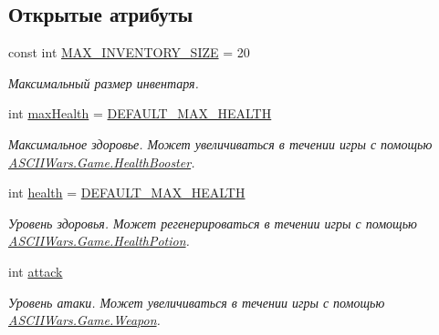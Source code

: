 \subsection*{Открытые атрибуты}
\begin{DoxyCompactItemize}
\item 
const int \hyperlink{class_a_s_c_i_i_wars_1_1_game_1_1_player_a1cc8a05398a717bcf8c5a0ebd2ea0747}{M\+A\+X\+\_\+\+I\+N\+V\+E\+N\+T\+O\+R\+Y\+\_\+\+S\+I\+ZE} = 20
\begin{DoxyCompactList}\small\item\em Максимальный размер инвентаря. \end{DoxyCompactList}\item 
int \hyperlink{class_a_s_c_i_i_wars_1_1_game_1_1_player_acfd121f865f0e5a87f177e93c82feadc}{max\+Health} = \hyperlink{class_a_s_c_i_i_wars_1_1_game_1_1_player_ab5921985db319187e317563c15ef48dc}{D\+E\+F\+A\+U\+L\+T\+\_\+\+M\+A\+X\+\_\+\+H\+E\+A\+L\+TH}
\begin{DoxyCompactList}\small\item\em Максимальное здоровье. Может увеличиваться в течении игры с помощью \hyperlink{class_a_s_c_i_i_wars_1_1_game_1_1_health_booster}{A\+S\+C\+I\+I\+Wars.\+Game.\+Health\+Booster}. \end{DoxyCompactList}\item 
\hypertarget{class_a_s_c_i_i_wars_1_1_game_1_1_player_a8f364a47ef452b6c99bc13b7bdaae7ca}{}\label{class_a_s_c_i_i_wars_1_1_game_1_1_player_a8f364a47ef452b6c99bc13b7bdaae7ca} 
int \hyperlink{class_a_s_c_i_i_wars_1_1_game_1_1_player_a8f364a47ef452b6c99bc13b7bdaae7ca}{health} = \hyperlink{class_a_s_c_i_i_wars_1_1_game_1_1_player_ab5921985db319187e317563c15ef48dc}{D\+E\+F\+A\+U\+L\+T\+\_\+\+M\+A\+X\+\_\+\+H\+E\+A\+L\+TH}
\begin{DoxyCompactList}\small\item\em Уровень здоровья. Может регенерироваться в течении игры с помощью \hyperlink{class_a_s_c_i_i_wars_1_1_game_1_1_health_potion}{A\+S\+C\+I\+I\+Wars.\+Game.\+Health\+Potion}. \end{DoxyCompactList}\item 
\hypertarget{class_a_s_c_i_i_wars_1_1_game_1_1_player_a45736ed2f9941e3877df09db83cd4032}{}\label{class_a_s_c_i_i_wars_1_1_game_1_1_player_a45736ed2f9941e3877df09db83cd4032} 
int \hyperlink{class_a_s_c_i_i_wars_1_1_game_1_1_player_a45736ed2f9941e3877df09db83cd4032}{attack}
\begin{DoxyCompactList}\small\item\em Уровень атаки. Может увеличиваться в течении игры с помощью \hyperlink{class_a_s_c_i_i_wars_1_1_game_1_1_weapon}{A\+S\+C\+I\+I\+Wars.\+Game.\+Weapon}. \end{DoxyCompactList}\item 

\end{DoxyCompactItemize}
